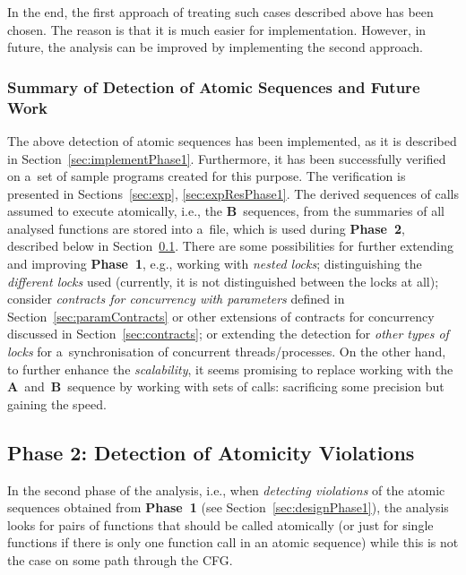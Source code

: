 In the end, the first approach of treating such cases described above has
been chosen. The reason is that it is much easier for implementation.
However, in future, the analysis can be improved by implementing the second
approach.

\subsubsection{Summary of Detection of Atomic Sequences and Future Work}

The above detection of atomic sequences has been implemented, as it is
described in Section~\ref{sec:implementPhase1}. Furthermore, it has
been successfully verified on a~set of sample programs created for
this purpose. The verification is presented in Sections~\ref{sec:exp},
\ref{sec:expResPhase1}. The derived sequences of calls assumed to
execute atomically, i.e., the \textbf{B}~sequences, from the summaries
of all analysed functions are stored into a~file, which is used during
\textbf{Phase~2}, described below in Section~\ref{sec:designPhase2}.
There are some possibilities for further extending and improving
\textbf{Phase~1}, e.g., working with \emph{nested locks}; distinguishing
the \emph{different locks} used (currently, it is not distinguished
between the locks at all); consider \emph{contracts for concurrency with
parameters} defined in Section~\ref{sec:paramContracts} or other extensions
of contracts for concurrency discussed in Section~\ref{sec:contracts}; or
extending the detection for \emph{other types of locks} for a~synchronisation
of concurrent threads/processes. On the other hand, to further enhance the
\emph{scalability}, it seems promising to replace working with the
\textbf{A}~and~\textbf{B}~sequence by working with sets of calls: sacrificing
some precision but gaining the speed.


\subsection{Phase 2: Detection of Atomicity Violations}
\label{sec:designPhase2}

In the second phase of the analysis, i.e., when \emph{detecting
violations} of the atomic sequences obtained from \textbf{Phase~1}
(see Section~\ref{sec:designPhase1}), the analysis looks for pairs of
functions that should be called atomically (or just for single functions
if there is only one function call in an atomic sequence) while this is
not the case on some path through the CFG.

